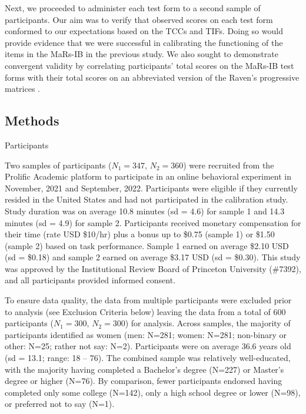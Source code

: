 \documentclass[a4paper,man,natbib,noextraspace]{apa6}
\makeatletter
\renewcommand{\subsubsection}{\@startsection{subsubsection}{3}
  {\z@}%
  {\b@level@two@skip}{\e@level@two@skip}%
  {\normalfont\normalsize\bfseries}}
\makeatother
\begin{document}
Next, we proceeded to administer each test form to a second sample of participants. Our aim was to verify that observed scores on each test form conformed to our expectations based on the TCCs and TIFs. Doing so would provide evidence that we were successful in calibrating the functioning of the items in the MaRs-IB in the previous study. We also sought to demonstrate convergent validity by correlating participants' total scores on the MaRs-IB test forms with their total scores on an abbreviated version of the Raven's progressive matrices \citep{bilker2012development}.

\subsection{Methods}

\subsubsection{Participants}

Two samples of participants ($N_1=347$, $N_2=360$) were recruited from the Prolific Academic platform to participate in an online behavioral experiment in November, 2021 and September, 2022. Participants were eligible if they currently resided in the United States and had not participated in the calibration study. Study duration was on average 10.8 minutes (sd = 4.6) for sample 1 and 14.3 minutes (sd = 4.9) for sample 2. Participants received monetary compensation for their time (rate USD \$10/hr) plus a bonus up to \$0.75 (sample 1) or \$1.50 (sample 2) based on task performance. Sample 1 earned on average \$2.10 USD (sd = \$0.18) and sample 2 earned on average \$3.17 USD (sd = \$0.30). This study was approved by the Institutional Review Board of Princeton University (\#7392), and all participants provided informed consent. 

To ensure data quality, the data from multiple participants were excluded prior to analysis (see Exclusion Criteria below) leaving the data from a total of 600 participants ($N_1=300$, $N_2=300$) for analysis. Across samples, the majority of participants identified as women (men: N=281; women: N=281; non-binary or other: N=25; rather not say: N=2). Participants were on average 36.6 years old (sd = 13.1; range: 18 -- 76). The combined sample was relatively well-educated, with the majority having completed a Bachelor's degree (N=227) or Master's degree or higher (N=76). By comparison, fewer participants endorsed having completed only some college (N=142), only a high school degree or lower (N=98), or preferred not to say (N=1). 
\end{document}
